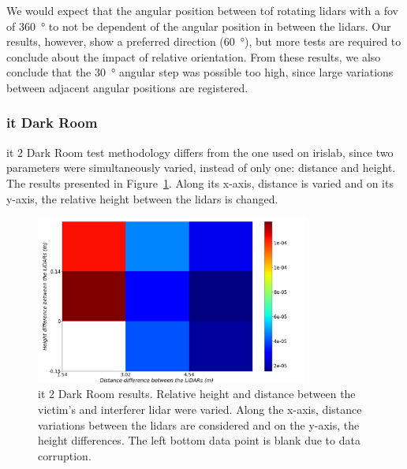 We would expect that the angular position between \ac{tof} rotating \acp{lidar} with a \ac{fov} of \SI{360}{\degree} to not be dependent of the angular position in between the \acp{lidar}. Our results, however, show a preferred direction (\SI{60}{\degree}), but more tests are required to conclude about the impact of relative orientation. From these results, we also conclude that the \SI{30}{\degree} angular step was possible too high, since large variations between adjacent angular positions are registered.




\subsubsection{\ac{it} Dark Room}
\ac{it} 2 Dark Room test methodology differs from the one used on \ac{irislab}, since two parameters were simultaneously varied, instead of only one: distance and height. The results presented in Figure~\ref{fig:box-filter-outliers-it2}. Along its x-axis, distance is varied and on its y-axis, the relative height between the \acp{lidar} is changed.

\begin{figure}[!ht]
\centering
\includegraphics[width=0.8\textwidth]{img/lidar-interference/box-filtering/interference-box-filter-outliers-it2.png}
\caption[Relative number of outliers when the distance and height between the \acp{lidar} are varied on \ac{it} 2 Dark Room.]{\ac{it} 2 Dark Room results. Relative height and distance between the victim's and interferer \ac{lidar} were varied. Along the x-axis, distance variations between the \acp{lidar} are considered and on the y-axis, the height differences. The left bottom data point is blank due to data corruption.}
\label{fig:box-filter-outliers-it2}
\end{figure}

